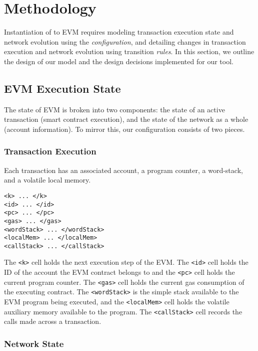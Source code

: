 \section{Methodology}

Instantiation of \K{} to EVM requires modeling transaction execution state and
network evolution using the \textit{configuration}, and detailing
changes in transaction execution and network evolution using transition
\textit{rules}. In this section, we outline the design of our \K{} model and the
design decisions implemented for our tool.

\subsection{EVM Execution State}

The state of EVM is broken into two components: the state of an active
transaction (smart contract execution), and the state of the network as a whole
(account information). To mirror this, our configuration consists of two pieces.

\subsubsection{Transaction Execution}

Each transaction has an associated account, a program counter, a word-stack, and
a volatile local memory.

\begin{verbatim}
<k> ... </k>
<id> ... </id>
<pc> ... </pc>
<gas> ... </gas>
<wordStack> ... </wordStack>
<localMem> ... </localMem>
<callStack> ... </callStack>
\end{verbatim}

The \texttt{<k>} cell holds the next execution step of the EVM. The
\texttt{<id>} cell holds the ID of the account the EVM contract belongs to and
the \texttt{<pc>} cell holds the current program counter. The \texttt{<gas>}
cell holds the current gas consumption of the executing contract. The
\texttt{<wordStack>} is the simple stack available to the EVM program being
executed, and the \texttt{<localMem>} cell holds the volatile auxiliary memory
available to the program. The \texttt{<callStack>} cell records the calls made
across a transaction.

\subsubsection{Network State}

